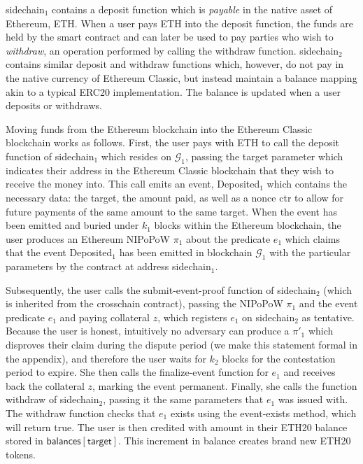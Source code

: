 \textsf{sidechain}$_1$ contains a \textsf{deposit} function
which is \emph{payable} in the native asset of Ethereum, ETH. When a user pays
ETH into the \textsf{deposit} function, the funds are held by the smart contract
and can later be used to pay parties who wish to \emph{withdraw}, an operation
performed by calling the \textsf{withdraw} function. \textsf{sidechain}$_2$
contains similar \textsf{deposit} and \textsf{withdraw} functions which,
however, do not pay in the native currency of Ethereum Classic, but instead
maintain a \textsf{balance} mapping akin to a typical ERC20 implementation. The
balance is updated when a user deposits or withdraws.

Moving funds from the Ethereum blockchain into the Ethereum Classic blockchain
works as follows. First, the user pays with ETH to call the \textsf{deposit}
function of \textsf{sidechain}$_1$ which resides on $\mathcal{G}_1$, passing the
\textsf{target} parameter which indicates their address in the Ethereum Classic
blockchain that they wish to receive the money into. This call emits an event,
\textsf{Deposited}$_1$ which contains the necessary data: the \textsf{target},
the \textsf{amount} paid, as well as a nonce \textsf{ctr} to allow for future
payments of the same amount to the same target. When the event has been emitted
and buried under $k_1$ blocks within the Ethereum blockchain, the user produces
an Ethereum NIPoPoW $\pi_1$ about the predicate $e_1$ which claims that the
event \textsf{Deposited}$_1$ has been emitted in blockchain $\mathcal{G}_1$ with
the particular parameters by the contract at address \textsf{sidechain}$_1$.

Subsequently, the user calls the \textsf{submit-event-proof} function of
\textsf{sidechain}$_2$ (which is inherited from the \textsf{crosschain}
contract), passing the NIPoPoW $\pi_1$ and the event predicate $e_1$ and paying
collateral $z$, which registers $e_1$ on \textsf{sidechain}$_2$ as tentative.
Because the user is honest, intuitively no adversary can produce a $\pi'_1$
which disproves their claim during the dispute period (we make this statement
formal in the appendix), and therefore the user waits for $k_2$ blocks for the
contestation period to expire. She then calls the \textsf{finalize-event}
function for $e_1$ and receives back the collateral $z$, marking the event
permanent. Finally, she calls the function \textsf{withdraw} of
\textsf{sidechain}$_2$, passing it the same parameters that $e_1$ was issued
with. The \textsf{withdraw} function checks that $e_1$ exists using the
\textsf{event-exists} method, which will return \textsf{true}. The user is then
credited with \textsf{amount} in their ETH20 balance stored in
$\textsf{balances}[\textsf{target}]$. This increment in balance creates brand
new ETH20 tokens.

